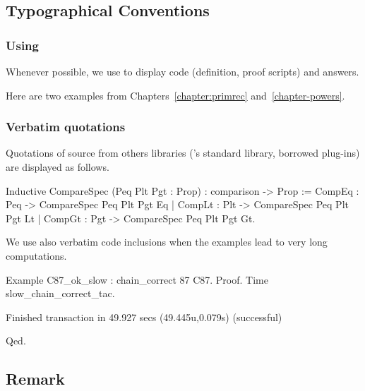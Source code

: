 \documentclass[twoside,a4paper]{book}
\makeatletter
\newcounter{snippets}
\newcommand{\inputsnippets}[1]
  {{\setlength{\itemsep}{1pt}\setlength{\parsep}{0pt}%
    \alectryon@copymacros\begin{io}
      \forcsvlist{\item\@inputsnippet}{#1}
    \end{io}}}
\let@old Save definition of 
\newcommand{\@inputsnippet}[1]
  {{\renewenvironment{alectryon}{}{}%
    \refstepcounter{snippets}%
    @old{movies/snippets/#1}}}
\makeatother
\begin{document}



\subsection{Typographical Conventions}


\subsubsection{Using \alectr}
Whenever possible, we use \alectr to display \coq code (definition, proof scripts) and answers.

Here are two  examples from Chapters~\ref{chapter:primrec}
and~\ref{chapter-powers}.

\vspace{4pt}




\inputsnippets{Fib2/fibEuclDemo}

\subsubsection{Verbatim quotations}

Quotations of \coq{} source  from others libraries (\coq's standard library, borrowed plug-ins)  are displayed as follows.

\begin{Coqsrc}
  Inductive CompareSpec (Peq Plt Pgt : Prop) :
  comparison -> Prop :=
    CompEq : Peq -> CompareSpec Peq Plt Pgt Eq
  | CompLt : Plt -> CompareSpec Peq Plt Pgt Lt
  | CompGt : Pgt -> CompareSpec Peq Plt Pgt Gt.
\end{Coqsrc}

We use also verbatim code inclusions when the examples lead to very long computations.

\begin{Coqbad}
Example C87_ok_slow : chain_correct 87 C87.
Proof.
Time slow_chain_correct_tac.
\end{Coqbad}

\begin{Coqanswer}
Finished transaction in 49.927 secs (49.445u,0.079s) (successful)
\end{Coqanswer}

\begin{Coqbad}
Qed.
\end{Coqbad}

 \subsection{Remark}
 
\end{document}
